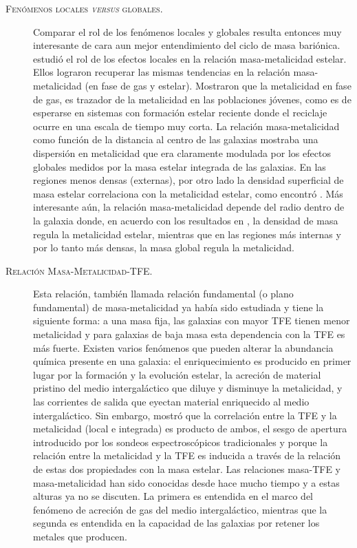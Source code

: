 \documentclass{article}
\begin{document}
\begin{description}
\item[\textsc{Fenómenos locales \emph{versus} globales.}] Comparar el rol de los fenómenos locales y
globales resulta entonces muy interesante de cara aun mejor entendimiento del ciclo de masa
bariónica. \citet{Gonzalez2014b} estudió el rol de los efectos locales en la relación
masa-metalicidad estelar. Ellos lograron recuperar las mismas tendencias en la relación
masa-metalicidad (en fase de gas y estelar). Mostraron que la metalicidad en fase de gas, es
trazador de la metalicidad en las poblaciones jóvenes, como es de esperarse en sistemas con
formación estelar reciente donde el reciclaje ocurre en una escala de tiempo muy corta.
La relación masa-metalicidad como función de la distancia al centro de las galaxias mostraba una
dispersión en metalicidad que era claramente modulada por los efectos globales medidos por la masa
estelar integrada de las galaxias. En las regiones menos densas (externas), por otro lado la
densidad superficial de masa estelar correlaciona con la metalicidad estelar, como encontró
\citet{Sanchez2013}. Más interesante aún, la relación masa-metalicidad depende del radio dentro de
la galaxia donde, en acuerdo con los resultados en \citet{Gonzalez2014a}, la densidad de masa regula
la metalicidad estelar, mientras que en las regiones más internas y por lo tanto más densas, la masa
global regula la metalicidad.

\item[\textsc{Relación Masa-Metalicidad-TFE.}] Esta relación, también llamada relación fundamental
(o plano fundamental) de masa-metalicidad ya había sido estudiada \citep{Lara-Lopez2010,
Mannucci2010} y tiene la siguiente forma: a una masa fija, las galaxias con mayor TFE tienen menor
metalicidad y para galaxias de baja masa esta dependencia con la TFE es más fuerte. Existen varios
fenómenos que pueden alterar la abundancia química presente en una galaxia: el enriquecimiento es
producido en primer lugar por la formación y la evolución estelar, la acreción de material pristino
del medio intergaláctico que diluye y disminuye la metalicidad, y las corrientes de salida que
eyectan material enriquecido al medio intergaláctico.
Sin embargo, \citet{Sanchez2013} mostró que la correlación entre la TFE y la metalicidad (local e
integrada) es producto de ambos, el sesgo de apertura introducido por los sondeos espectroscópicos
tradicionales y porque la relación entre la metalicidad y la TFE es inducida a través de la relación
de estas dos propiedades con la masa estelar. Las relaciones masa-TFE y masa-metalicidad han sido
conocidas desde hace mucho tiempo y a estas alturas ya no se discuten. La primera es entendida en el
marco del fenómeno de acreción de gas del medio intergaláctico, mientras que la segunda es entendida
en la capacidad de las galaxias por retener los metales que producen.


\end{description}
\end{document}

